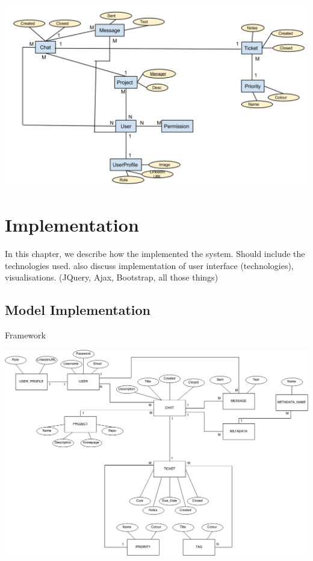 \documentclass[a4paper]{l3proj}
\begin{document}
  \includegraphics[scale=0.4]{ER_Diagram}

  \chapter{Implementation}
  \label{impl}

  In this chapter, we describe how the implemented the system. Should include the technologies used.  also discuss implementation of user interface (technologies), visualisations.
  (JQuery, Ajax, Bootstrap, all those things)

  \section{Model Implementation}
  \label{modelImpl}

  Framework

  \includegraphics[scale=0.35]{newERdiagram}
\end{document}
